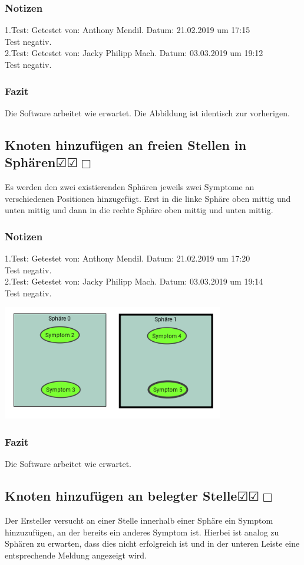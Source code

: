 \documentclass[enabledeprecatedfontcommands]{scrartcl}
\newcommand{\subsectiont}[2]{\subsection[#1]{#1{\normalsize\normalfont #2}}}
\newcommand{\leer}{$\Box$}
\newcommand{\ok}{$\CheckedBox$}
\begin{document}
\subsubsection{Notizen}
1.Test: Getestet von: Anthony Mendil. Datum: 21.02.2019 um 17:15 \\
Test negativ. \\
2.Test: Getestet von: Jacky Philipp Mach. Datum: 03.03.2019 um 19:12 \\
Test negativ.
\subsubsection{Fazit}
Die Software arbeitet wie erwartet. Die Abbildung ist identisch zur vorherigen.

\subsectiont{Knoten hinzufügen an freien Stellen in Sphären}{\dotfill\ok\ok\leer}
Es werden den zwei existierenden Sphären jeweils zwei Symptome an verschiedenen Positionen hinzugefügt. Erst in die linke Sphäre oben mittig und unten mittig und dann in die rechte Sphäre oben mittig und unten mittig.  
\subsubsection{Notizen}
1.Test: Getestet von: Anthony Mendil. Datum: 21.02.2019 um 17:20 \\
Test negativ.\\
2.Test: Getestet von: Jacky Philipp Mach. Datum: 03.03.2019 um 19:14 \\
Test negativ.
\begin{center}
\includegraphics[height=5cm]{1_3.PNG}
\end{center}
\subsubsection{Fazit}
Die Software arbeitet wie erwartet.

\subsectiont{Knoten hinzufügen an belegter Stelle}{\dotfill\ok\ok\leer}
Der Ersteller versucht an einer Stelle innerhalb einer Sphäre ein Symptom hinzuzufügen, an der bereits ein anderes Symptom ist. Hierbei ist analog zu Sphären zu erwarten, dass dies nicht erfolgreich ist und in der unteren Leiste eine entsprechende Meldung angezeigt wird.
\end{document}
